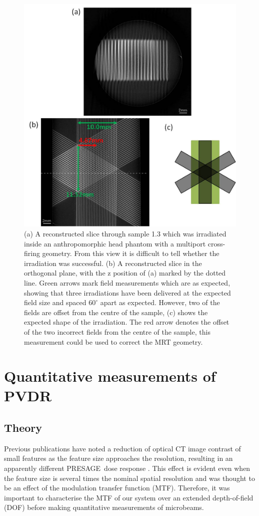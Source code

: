 \documentclass[12pt]{article}
\begin{document}
\begin{figure}
\centering
\includegraphics[width=0.9\linewidth]{Fig4}
\caption{(a) A reconstructed slice through sample 1.3 which was irradiated inside an anthropomorphic head phantom with a multiport cross-firing geometry. From this view it is difficult to tell whether the irradiation was successful. (b) A reconstructed slice in the orthogonal plane, with the z position of (a) marked by the dotted line. Green arrows mark field measurements which are as expected, showing that three irradiations have been delivered at the expected field size and spaced $60^{\circ}$ apart as expected. However, two of the fields are offset from the centre of the sample, (c) shows the expected shape of the irradiation. The red arrow denotes the offset of the two incorrect fields from the centre of the sample, this measurement could be used to correct the MRT geometry.}
\label{fig:Fig4L7}
\end{figure}




\section{Quantitative measurements of PVDR}
\label{sec:quantPVDR}
\subsection{Theory}
Previous publications have noted a reduction of optical CT image contrast of small features as the feature size approaches the resolution, resulting in an apparently different PRESAGE\textregistered \ dose response \cite{doranultra-high2013}. This effect is evident even when the feature size is several times the nominal spatial resolution and was thought to be an effect of the modulation transfer function (MTF). Therefore, it was important to characterise the MTF of our system over an extended depth-of-field (DOF) before making quantitative measurements of microbeams. 
\end{document}
